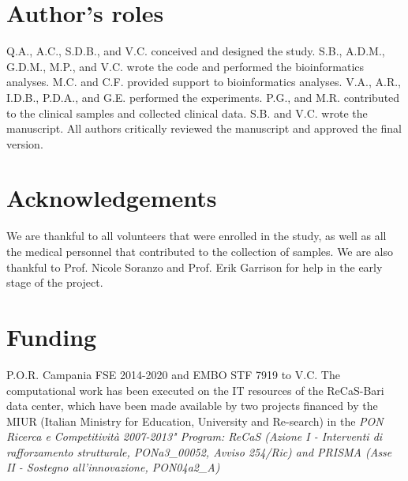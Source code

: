 \section*{Author’s roles}
Q.A., A.C., S.D.B., and V.C. conceived and designed the study. 
S.B., A.D.M., G.D.M., M.P., and V.C. wrote the code and performed the bioinformatics analyses.
M.C. and C.F. provided support to bioinformatics analyses. 
V.A., A.R., I.D.B., P.D.A., and G.E. performed the experiments.  
P.G., and M.R. contributed to the clinical samples and collected clinical data. 
S.B. and V.C. wrote the manuscript. 
All authors critically reviewed the manuscript and approved the final version.

\section*{Acknowledgements}
We are thankful to all volunteers that were enrolled in the study, as well as all the medical personnel that contributed to the collection of samples. We are also thankful to Prof. Nicole Soranzo and Prof. Erik Garrison for help in the early stage of the project.   


\section*{Funding}
P.O.R. Campania FSE 2014-2020 and EMBO STF 7919 to V.C. The computational work has been executed on the IT resources of the ReCaS-Bari data center, which have been made available by two projects financed by the MIUR (Italian Ministry for Education, University and Re-search) in the \textit{PON Ricerca e Competitività 2007-2013" Program: ReCaS (Azione I - Interventi di rafforzamento strutturale, PONa3\_00052, Avviso 254/Ric) and PRISMA (Asse II - Sostegno all'innovazione, PON04a2\_A)}

